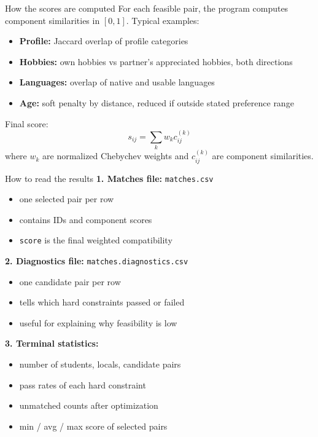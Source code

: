 \documentclass[aspectratio=169]{beamer}
\begin{document}
\begin{frame}{How the scores are computed}
For each feasible pair, the program computes component similarities in $[0,1]$.
Typical examples:
\begin{itemize}
  \item \textbf{Profile:} Jaccard overlap of profile categories
  \item \textbf{Hobbies:} own hobbies vs partner's appreciated hobbies, both directions
  \item \textbf{Languages:} overlap of native and usable languages
  \item \textbf{Age:} soft penalty by distance, reduced if outside stated preference range
\end{itemize}
Final score:
\[
s_{ij} = \sum_k w_k c_{ij}^{(k)}
\]
where $w_k$ are normalized Chebychev weights and $c_{ij}^{(k)}$ are component similarities.
\end{frame}

\begin{frame}{How to read the results}
\textbf{1. Matches file:} \texttt{matches.csv}
\begin{itemize}
  \item one selected pair per row
  \item contains IDs and component scores
  \item \texttt{score} is the final weighted compatibility
\end{itemize}

\textbf{2. Diagnostics file:} \texttt{matches.diagnostics.csv}
\begin{itemize}
  \item one candidate pair per row
  \item tells which hard constraints passed or failed
  \item useful for explaining why feasibility is low
\end{itemize}

\textbf{3. Terminal statistics:}
\begin{itemize}
  \item number of students, locals, candidate pairs
  \item pass rates of each hard constraint
  \item unmatched counts after optimization
  \item min / avg / max score of selected pairs
\end{itemize}
\end{frame}
\end{document}
